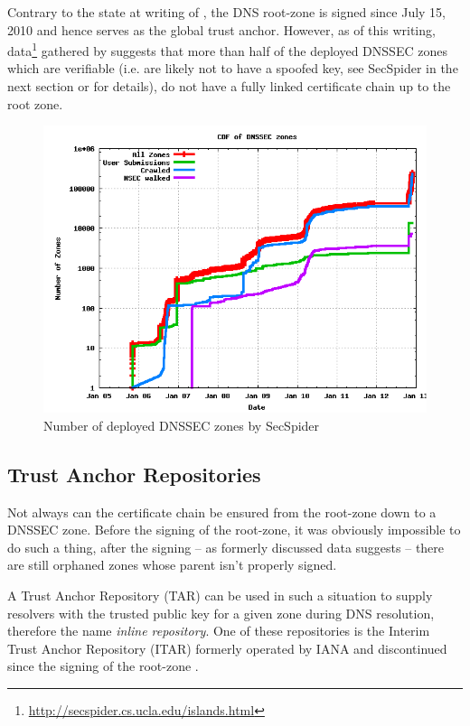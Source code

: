 \documentclass[a4paper,twocolumn]{scrartcl}
\begin{document}
Contrary to the state at writing of \cite{Osterweil09}, the DNS
root-zone is signed since July 15, 2010 \cite{root-dnssec} and hence
serves as the global trust anchor. However, as of this writing,
data\footnote{\url{http://secspider.cs.ucla.edu/islands.html}}
gathered by \cite{secspider} suggests that more than half of the
deployed DNSSEC zones which are verifiable (i.e. are likely not to
have a spoofed key, see SecSpider in the next section or
\cite{Osterweil09} for details), do not have a fully linked
certificate chain up to the root zone.

\begin{figure}
  \includegraphics[width=\linewidth]{dnssec-growth}
  \caption{Number of deployed DNSSEC zones by
    SecSpider \cite{secspider}}
  \label{fig:dnssec-growth}
\end{figure}

\subsection{Trust Anchor Repositories}
Not always can the certificate chain be ensured from the root-zone
down to a DNSSEC zone. Before the signing of the root-zone, it was
obviously impossible to do such a thing, after the signing -- as
formerly discussed data suggests -- there are still orphaned zones
whose parent isn't properly signed.

A Trust Anchor Repository (TAR) can be used in such a situation to
supply resolvers with the trusted public key for a given zone during
DNS resolution, therefore the name \emph{inline repository}. One of
these repositories is the Interim Trust Anchor Repository (ITAR)
formerly operated by IANA and discontinued since the signing of the
root-zone \cite{itar}.
\end{document}
